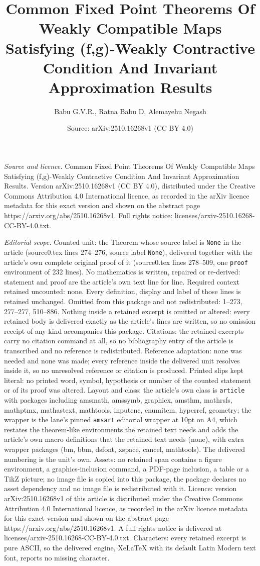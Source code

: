 \documentclass[10pt,a4paper]{amsart}
\title[Common Fixed Point Theorems Of Weakly Compatible Maps Satisf]{Common Fixed Point Theorems Of Weakly Compatible Maps Satisfying (f,g)-Weakly Contractive Condition And Invariant Approximation Results}
\author{Babu G.V.R., Ratna Babu D, Alemayehu Negash}
\date{Source: arXiv:2510.16268v1 (CC BY 4.0)}
\begin{document}
\maketitle

\noindent\emph{Source and licence.} Common Fixed Point Theorems Of Weakly Compatible Maps Satisfying (f,g)-Weakly Contractive Condition And Invariant Approximation Results. Version arXiv:2510.16268v1 (CC BY 4.0), distributed under the Creative Commons Attribution 4.0 International licence, as recorded in the arXiv licence metadata for this exact version and shown on the abstract page https://arxiv.org/abs/2510.16268v1. Full rights notice: licenses/arxiv-2510.16268-CC-BY-4.0.txt.\par\smallskip

\noindent\textit{Editorial scope.} Counted unit: the Theorem whose source label is \texttt{None} in the article (source0.tex lines 274--276, source label \texttt{None}), delivered together with the article's own complete original proof of it (source0.tex lines 278--509, one \texttt{proof} environment of 232 lines). No mathematics is written, repaired or re-derived: statement and proof are the article's own text line for line. Required context retained uncounted: none. Every definition, display and label of those lines is retained unchanged. Omitted from this package and not redistributed: 1--273, 277--277, 510--886. Nothing inside a retained excerpt is omitted or altered: every retained body is delivered exactly as the article's lines are written, so no omission receipt of any kind accompanies this package. Citations: the retained excerpts carry no citation command at all, so no bibliography entry of the article is transcribed and no reference is redistributed. Reference adaptation: none was needed and none was made; every reference inside the delivered unit resolves inside it, so no unresolved reference or citation is produced. Printed slips kept literal: no printed word, symbol, hypothesis or number of the counted statement or of its proof was altered. Layout and class: the article's own class is \texttt{article} with packages including amsmath, amssymb, graphicx, amsthm, mathrsfs, mathptmx, mathastext, mathtools, inputenc, enumitem, hyperref, geometry; the wrapper is the lane's pinned \texttt{amsart} editorial wrapper at 10pt on A4, which restates the theorem-like environments the retained text needs and adds the article's own macro definitions that the retained text needs (none), with extra wrapper packages (bm, bbm, dsfont, xspace, cancel, mathtools). The delivered numbering is the unit's own. Assets: no retained span contains a figure environment, a graphics-inclusion command, a PDF-page inclusion, a table or a TikZ picture; no image file is copied into this package, the package declares no asset dependency and no image file is redistributed with it. Licence: version arXiv:2510.16268v1 of this article is distributed under the Creative Commons Attribution 4.0 International licence, as recorded in the arXiv licence metadata for this exact version and shown on the abstract page https://arxiv.org/abs/2510.16268v1. A full rights notice is delivered at licenses/arxiv-2510.16268-CC-BY-4.0.txt. Characters: every retained excerpt is pure ASCII, so the delivered engine, XeLaTeX with its default Latin Modern text font, reports no missing character.
\end{document}
